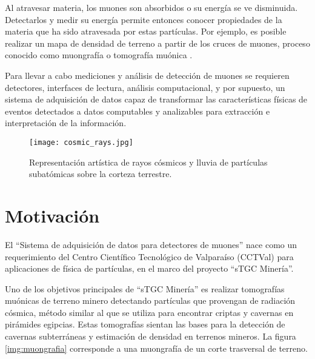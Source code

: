 	Al atravesar materia, los muones son absorbidos o su energía se ve disminuida. Detectarlos y medir su energía permite entonces conocer propiedades de la materia que ha sido atravesada por estas partículas. Por ejemplo, es posible realizar un mapa de densidad de terreno a partir de los cruces de muones, proceso conocido como muongrafía o tomografía muónica .
	
	Para llevar a cabo mediciones y análisis de detección de muones se requieren detectores, interfaces de lectura, análisis computacional, y por supuesto, un sistema de adquisición de datos capaz de  transformar las características físicas de eventos detectados a datos computables y analizables para extracción e interpretación de la información.
	
	\begin{figure}[h]
		\centering
		\texttt{[image: cosmic\_rays.jpg]}
		\caption{Representación artística de rayos cósmicos y lluvia de partículas subatómicas sobre la corteza terrestre.}
		\label{img:cosmic-ray}
	\end{figure}
	
	
\section{Motivación}
	El ``Sistema de adquisición de datos para detectores de muones'' nace como un requerimiento del Centro Científico Tecnológico de Valparaíso (CCTVal) para aplicaciones de física de partículas, en el marco del proyecto ``sTGC Minería''. 
	
	Uno de los objetivos principales de ``sTGC Minería'' es realizar tomografías muónicas de terreno minero detectando partículas que provengan de radiación cósmica, método similar al que se utiliza para encontrar criptas y cavernas en pirámides egipcias. Estas tomografías sientan las bases para la detección de cavernas subterráneas y estimación de densidad en terrenos mineros. La figura \ref{img:muongrafia} corresponde a una muongrafía de un corte trasversal de terreno. 

